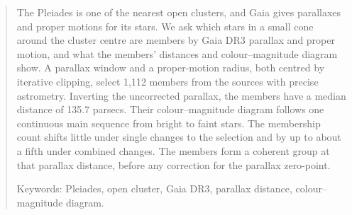 \begin{abstract}
The Pleiades is one of the nearest open clusters, and Gaia gives parallaxes and proper motions for its stars. We ask which stars in a small cone around the cluster centre are members by Gaia DR3 parallax and proper motion, and what the members' distances and colour--magnitude diagram show. A parallax window and a proper-motion radius, both centred by iterative clipping, select 1,112 members from the sources with precise astrometry.
Inverting the uncorrected parallax, the members have a median distance of 135.7 parsecs.
Their colour--magnitude diagram follows one continuous main sequence from bright to faint stars. The membership count shifts little under single changes to the selection and by up to about a fifth under combined changes. The members form a coherent group at that parallax distance, before any correction for the parallax zero-point.

Keywords: Pleiades, open cluster, Gaia DR3, parallax distance, colour--magnitude diagram.
\end{abstract}

